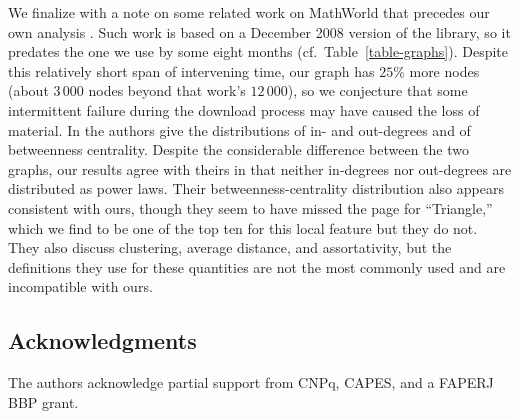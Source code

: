 \documentclass{article}
\begin{document}
We finalize with a note on some related work on MathWorld that precedes our own
analysis \cite{jg09}. Such work is based on a December 2008 version of the
library, so it predates the one we use by some eight months
(cf.\ Table~\ref{table-graphs}). Despite this relatively short span of
intervening time, our graph has $25\%$ more nodes (about $3\,000$ nodes beyond
that work's $12\,000$), so we conjecture that some intermittent failure during
the download process may have caused the loss of material. In \cite{jg09} the
authors give the distributions of in- and out-degrees and of betweenness
centrality. Despite the considerable difference between the two graphs, our
results agree with theirs in that neither in-degrees nor out-degrees are
distributed as power laws. Their betweenness-centrality distribution also
appears consistent with ours, though they seem to have missed the page for
``Triangle,'' which we find to be one of the top ten for this local feature but
they do not. They also discuss clustering, average distance, and assortativity,
but the definitions they use for these quantities are not the most commonly used
and are incompatible with ours.

\subsection*{Acknowledgments}

The authors acknowledge partial support from CNPq, CAPES, and a FAPERJ BBP
grant.



\end{document}
